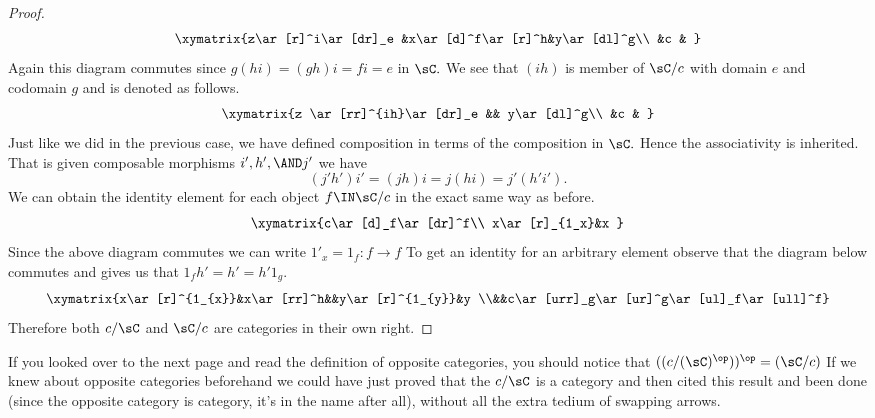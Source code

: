 \documentclass[main.tex]{subfiles}
\begin{document}
\begin{proof}
	\[\xymatrix{z\ar[r]^i\ar[dr]_e &x\ar[d]^f\ar[r]^h&y\ar[dl]^g\\ &c & }\]
	Again this diagram commutes since \(g(hi)=(gh)i=fi=e\) in \(\sC.\)
	We see that \((ih)\) is member of \(\sC/c\) with domain \(e\) and
	codomain \(g\) and is denoted as follows.
	\[\xymatrix{z \ar[rr]^{ih}\ar[dr]_e && y\ar[dl]^g\\ &c & }\]
	Just like we did in the previous case, we have defined composition in
	terms of the composition in \(\sC.\) Hence the associativity is
	inherited. That is given composable morphisms \(i',h',\AND j'\) we have
	\[(j'h')i'=(jh)i=j(hi)=j'(h'i').\]
	We can obtain the identity element for each object \(f\IN \sC/c\) in the
	exact same way as before.
	\[\xymatrix{c\ar[d]_f\ar[dr]^f\\ x\ar[r]_{1_x}&x }\]
	Since the above diagram commutes we can write \(1'_x=1_{f}:f\to f\) To
	get an identity for an arbitrary element observe that the diagram below
	commutes and gives us that \(1_{f}h'=h'=h'1_{g}\).
	\[\xymatrix{x\ar[r]^{1_{x}}&x\ar[rr]^h&&y\ar[r]^{1_{y}}&y
							 \\&&c\ar[urr]_g\ar[ur]^g\ar[ul]_f\ar[ull]^f}\]
	Therefore both \(c/\sC\) and \(\sC/c\) are categories in their own right.
\end{proof}

If you looked over to the next page and read the definition of opposite
categories, you should notice that \(((c/(\sC)^{\op}))^{\op}=(\sC/c)\)
If we knew about opposite categories beforehand we could have just
proved that the \(c/\sC\) is a category and then cited this result and
been done (since the opposite category is category, it's in the name
after all), without all the extra tedium of swapping arrows.
\end{document}
